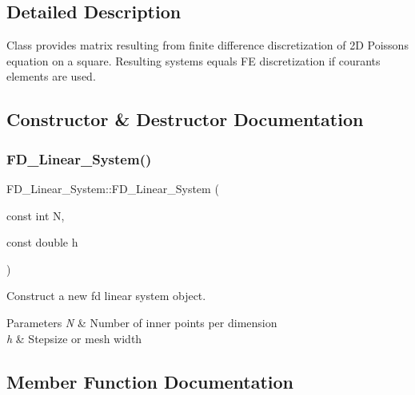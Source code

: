 \subsection{Detailed Description}
Class provides matrix resulting from finite difference discretization of 2D Poisson\textquotesingle{}s equation on a square. Resulting systems equals FE discretization if courants elements are used. 

\subsection{Constructor \& Destructor Documentation}
\mbox{\label{classFD__Linear__System_a468ed4f5d475fdf24a931f8bed1b468d}} 
\subsubsection{\texorpdfstring{F\+D\+\_\+\+Linear\+\_\+\+System()}{FD\_Linear\_System()}}
{\footnotesize\ttfamily F\+D\+\_\+\+Linear\+\_\+\+System\+::\+F\+D\+\_\+\+Linear\+\_\+\+System (\begin{DoxyParamCaption}\item[{const int}]{N,  }\item[{const double}]{h }\end{DoxyParamCaption})\hspace{0.3cm}{\ttfamily [inline]}}



Construct a new fd linear system object. 


\begin{DoxyParams}{Parameters}
{\em N} & Number of inner points per dimension \\
\hline
{\em h} & Stepsize or mesh width \\
\hline
\end{DoxyParams}


\subsection{Member Function Documentation}
\mbox{\label{classFD__Linear__System_afef1a0fde94661b29aa5f741d52855b1}} 

